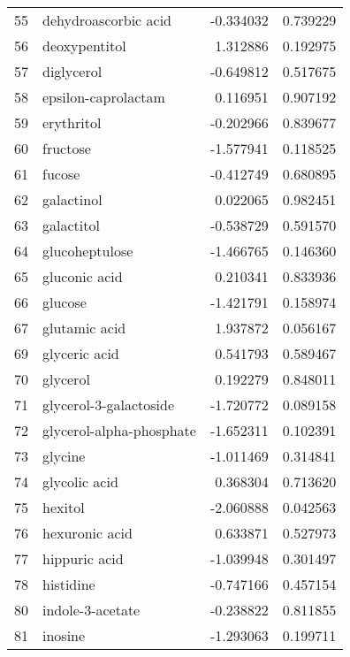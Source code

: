 \begin{tabular}{llrr}
55  &               dehydroascorbic acid & -0.334032 &  0.739229 \\
56  &                      deoxypentitol &  1.312886 &  0.192975 \\
57  &                         diglycerol & -0.649812 &  0.517675 \\
58  &                epsilon-caprolactam &  0.116951 &  0.907192 \\
59  &                         erythritol & -0.202966 &  0.839677 \\
60  &                           fructose & -1.577941 &  0.118525 \\
61  &                             fucose & -0.412749 &  0.680895 \\
62  &                         galactinol &  0.022065 &  0.982451 \\
63  &                         galactitol & -0.538729 &  0.591570 \\
64  &                     glucoheptulose & -1.466765 &  0.146360 \\
65  &                      gluconic acid &  0.210341 &  0.833936 \\
66  &                            glucose & -1.421791 &  0.158974 \\
67  &                      glutamic acid &  1.937872 &  0.056167 \\
69  &                      glyceric acid &  0.541793 &  0.589467 \\
70  &                           glycerol &  0.192279 &  0.848011 \\
71  &             glycerol-3-galactoside & -1.720772 &  0.089158 \\
72  &           glycerol-alpha-phosphate & -1.652311 &  0.102391 \\
73  &                            glycine & -1.011469 &  0.314841 \\
74  &                      glycolic acid &  0.368304 &  0.713620 \\
75  &                            hexitol & -2.060888 &  0.042563 \\
76  &                     hexuronic acid &  0.633871 &  0.527973 \\
77  &                      hippuric acid & -1.039948 &  0.301497 \\
78  &                          histidine & -0.747166 &  0.457154 \\
80  &                   indole-3-acetate & -0.238822 &  0.811855 \\
81  &                            inosine & -1.293063 &  0.199711 \\

\end{tabular}

